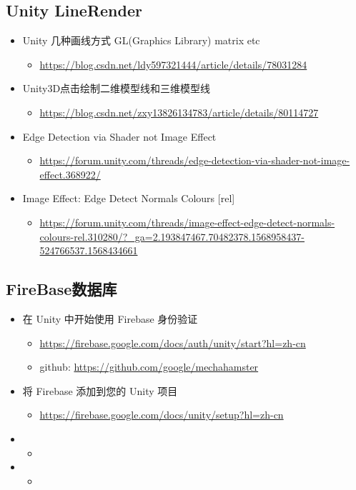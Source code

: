 \documentclass[9pt, b5paper]{article}
\begin{document}
\subsection{Unity LineRender}
\label{sec-3-2}
\begin{itemize}
\item Unity 几种画线方式 GL(Graphics Library) matrix etc
\begin{itemize}
\item \url{https://blog.csdn.net/ldy597321444/article/details/78031284}
\end{itemize}
\item Unity3D点击绘制二维模型线和三维模型线
\begin{itemize}
\item \url{https://blog.csdn.net/zxy13826134783/article/details/80114727}
\end{itemize}
\item Edge Detection via Shader not Image Effect
\begin{itemize}
\item \url{https://forum.unity.com/threads/edge-detection-via-shader-not-image-effect.368922/}
\end{itemize}
\item Image Effect: Edge Detect Normals Colours [rel]
\begin{itemize}
\item \url{https://forum.unity.com/threads/image-effect-edge-detect-normals-colours-rel.310280/?_ga=2.193847467.70482378.1568958437-524766537.1568434661}
\end{itemize}
\end{itemize}

\subsection{FireBase数据库}
\label{sec-3-3}
\begin{itemize}
\item 在 Unity 中开始使用 Firebase 身份验证
\begin{itemize}
\item \url{https://firebase.google.com/docs/auth/unity/start?hl=zh-cn}
\item github: \url{https://github.com/google/mechahamster}
\end{itemize}
\item 将 Firebase 添加到您的 Unity 项目
\begin{itemize}
\item \url{https://firebase.google.com/docs/unity/setup?hl=zh-cn}
\end{itemize}
\item \begin{itemize}
\item 
\end{itemize}
\item \begin{itemize}
\item 
\end{itemize}
\end{itemize}
\end{document}
